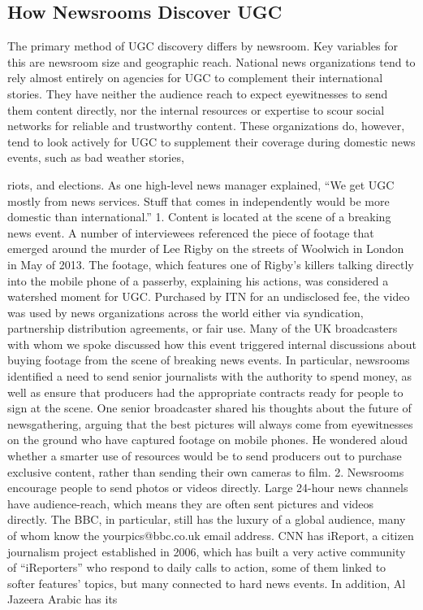 \begin{enumerate}
\section{How Newsrooms Discover UGC}
The primary method of UGC discovery differs by newsroom. Key variables
for this are newsroom size and geographic reach. National news organizations
tend to rely almost entirely on agencies for UGC to complement their
international stories. They have neither the audience reach to expect eyewitnesses
to send them content directly, nor the internal resources or expertise
to scour social networks for reliable and trustworthy content. These
organizations do, however, tend to look actively for UGC to supplement
their coverage during domestic news events, such as bad weather stories,

riots, and elections. As one high-level news manager explained, ``We get
UGC mostly from news services. Stuff that comes in independently would
be more domestic than international.''
1. Content is located at the scene of a breaking news event.
A number of interviewees referenced the piece of footage that emerged
around the murder of Lee Rigby on the streets of Woolwich in London
in May of 2013. The footage, which features one of Rigby's killers talking
directly into the mobile phone of a passerby, explaining his actions, was
considered a watershed moment for UGC. Purchased by ITN for an undisclosed
fee, the video was used by news organizations across the world either
via syndication, partnership distribution agreements, or fair use. Many of
the UK broadcasters with whom we spoke discussed how this event triggered
internal discussions about buying footage from the scene of breaking
news events. In particular, newsrooms identified a need to send senior journalists
with the authority to spend money, as well as ensure that producers
had the appropriate contracts ready for people to sign at the scene. One
senior broadcaster shared his thoughts about the future of newsgathering,
arguing that the best pictures will always come from eyewitnesses on the
ground who have captured footage on mobile phones. He wondered aloud
whether a smarter use of resources would be to send producers out to purchase
exclusive content, rather than sending their own cameras to film.
2. Newsrooms encourage people to send photos or videos directly.
Large 24-hour news channels have audience-reach, which means they are
often sent pictures and videos directly. The BBC, in particular, still has the
luxury of a global audience, many of whom know the yourpics@bbc.co.uk
email address. CNN has iReport, a citizen journalism project established in
2006, which has built a very active community of ``iReporters'' who respond
to daily calls to action, some of them linked to softer features' topics, but
many connected to hard news events. In addition, Al Jazeera Arabic has its


\end{enumerate}

